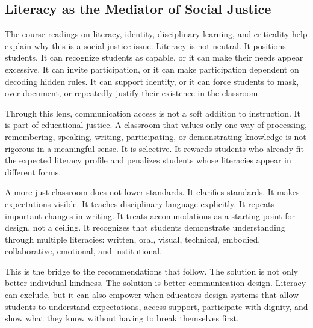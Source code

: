 \subsection*{Literacy as the Mediator of Social Justice}

The course readings on literacy, identity, disciplinary learning, and criticality help explain why this is a social justice issue. Literacy is not neutral. It positions students. It can recognize students as capable, or it can make their needs appear excessive. It can invite participation, or it can make participation dependent on decoding hidden rules. It can support identity, or it can force students to mask, over-document, or repeatedly justify their existence in the classroom.

Through this lens, communication access is not a soft addition to instruction. It is part of educational justice. A classroom that values only one way of processing, remembering, speaking, writing, participating, or demonstrating knowledge is not rigorous in a meaningful sense. It is selective. It rewards students who already fit the expected literacy profile and penalizes students whose literacies appear in different forms.

A more just classroom does not lower standards. It clarifies standards. It makes expectations visible. It teaches disciplinary language explicitly. It repeats important changes in writing. It treats accommodations as a starting point for design, not a ceiling. It recognizes that students demonstrate understanding through multiple literacies: written, oral, visual, technical, embodied, collaborative, emotional, and institutional.

This is the bridge to the recommendations that follow. The solution is not only better individual kindness. The solution is better communication design. Literacy can exclude, but it can also empower when educators design systems that allow students to understand expectations, access support, participate with dignity, and show what they know without having to break themselves first.
